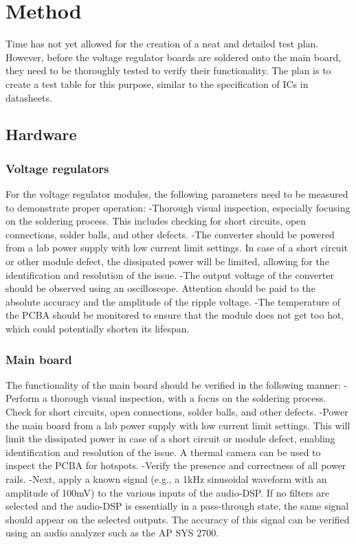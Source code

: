 \section{Method}
Time has not yet allowed for the creation of a neat and detailed test plan. However, before the voltage regulator boards are soldered onto the main board, they need to be thoroughly tested to verify their functionality. The plan is to create a test table for this purpose, similar to the specification of ICs in datasheets.

\subsection{Hardware}
\subsubsection{Voltage regulators}
For the voltage regulator modules, the following parameters need to be measured to demonstrate proper operation:
-Thorough visual inspection, especially focusing on the soldering process. This includes checking for short circuits, open connections, solder balls, and other defects.
-The converter should be powered from a lab power supply with low current limit settings. In case of a short circuit or other module defect, the dissipated power will be limited, allowing for the identification and resolution of the issue.
-The output voltage of the converter should be observed using an oscilloscope. Attention should be paid to the absolute accuracy and the amplitude of the ripple voltage.
-The temperature of the PCBA should be monitored to ensure that the module does not get too hot, which could potentially shorten its lifespan.

\subsubsection{Main board}
The functionality of the main board should be verified in the following manner:
-Perform a thorough visual inspection, with a focus on the soldering process. Check for short circuits, open connections, solder balls, and other defects.
-Power the main board from a lab power supply with low current limit settings. This will limit the dissipated power in case of a short circuit or module defect, enabling identification and resolution of the issue. A thermal camera can be used to inspect the PCBA for hotspots.
-Verify the presence and correctness of all power rails.
-Next, apply a known signal (e.g., a 1kHz sinusoidal waveform with an amplitude of 100mV) to the various inputs of the audio-DSP. If no filters are selected and the audio-DSP is essentially in a pass-through state, the same signal should appear on the selected outputs. The accuracy of this signal can be verified using an audio analyzer such as the AP SYS 2700.

